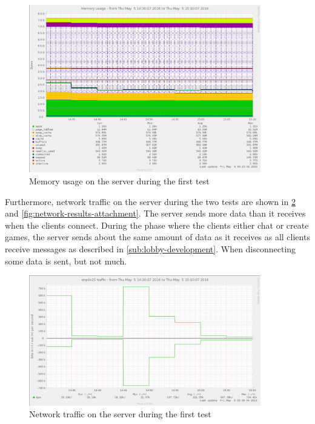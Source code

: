 \documentclass[a4paper]{article}
\begin{document}
\begin{figure}[ht!]
\centering
    \includegraphics[width=0.9\textwidth]{figure/serversidePerformance/2016-05-05-game-memory.png}
    \caption{Memory usage on the server during the first test}
    \label{fig:memory-results}
\end{figure}

Furthermore, network traffic on the server during the two tests are shown in \cref{fig:network-results} and \cref{fig:network-results-attachment}. The server sends more data than it receives when the clients connect. During the phase where the clients either chat or create games, the server sends about the same amount of data as it receives as all clients receive messages as described in \cref{sub:lobby-development}. When disconnecting some data is sent, but not much.

\begin{figure}[H]
\centering
    \includegraphics[width=0.9\textwidth]{figure/serversidePerformance/2016-05-05-network-traffic-game.png}
    \caption{Network traffic on the server during the first test}
    
    \label{fig:network-results}
\end{figure}
\end{document}
